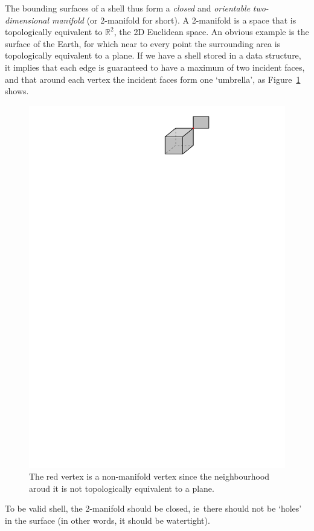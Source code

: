 \documentclass[a4paper,parskip=half,11pt]{scrartcl}
\newcommand{\ie}{ie}
\begin{document}
The bounding surfaces of a shell thus form a \emph{closed} and \emph{orientable}  \emph{two-dimensional manifold} (or 2-manifold for short).
A 2-manifold is a space that is topologically equivalent to $\mathbb{R}^2$, the 2D Euclidean space.
An obvious example is the surface of the Earth, for which near to every point the surrounding area is topologically equivalent to a plane. 
If we have a shell stored in a data structure, it implies that each edge is guaranteed to have a maximum of two incident faces, and that around each vertex the incident faces form one `umbrella', as Figure~\ref{fig:umbrella} shows.
\begin{figure}
  \centering
  \includegraphics[width=0.35\linewidth]{figs/umbrella}
  \caption{The red vertex is a non-manifold vertex since the neighbourhood aroud it is not topologically equivalent to a plane.}
\label{fig:umbrella}
\end{figure}
To be valid shell, the 2-manifold should be closed, \ie\ there should not be `holes' in the surface (in other words, it should be watertight).
\end{document}
